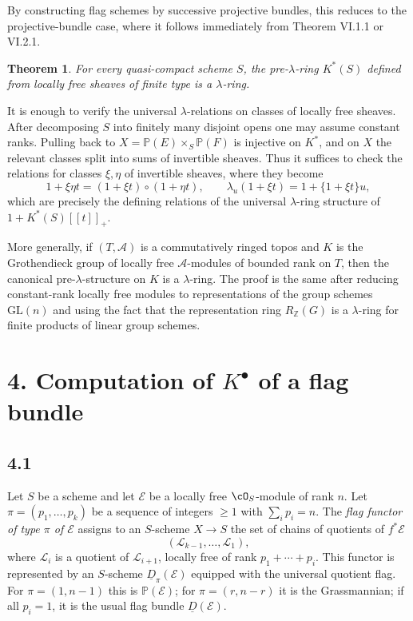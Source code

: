 \documentclass[11pt]{article}
\theoremstyle{plain}
\newtheorem{theorem}{Theorem}[section]
\theoremstyle{definition}
\theoremstyle{remark}
\newcommand{\ZZ}{\mathbb Z}
\begin{document}
By constructing flag schemes by successive projective bundles, this reduces to the projective-bundle case, where it follows immediately from Theorem VI.1.1 or VI.2.1.

\begin{theorem}\label{thm:VI.3.2}
For every quasi-compact scheme $S$, the pre-$\lambda$-ring $K^*(S)$ defined from locally free sheaves of finite type is a $\lambda$-ring.
\end{theorem}

It is enough to verify the universal $\lambda$-relations on classes of locally free sheaves. After decomposing $S$ into finitely many disjoint opens one may assume constant ranks. Pulling back to $X=\mathbb P(E)\times_S\mathbb P(F)$ is injective on $K^*$, and on $X$ the relevant classes split into sums of invertible sheaves. Thus it suffices to check the relations for classes $\xi,\eta$ of invertible sheaves, where they become
\[
1+\xi\eta t=(1+\xi t)\circ(1+\eta t),
\qquad
\lambda_u(1+\xi t)=1+\{1+\xi t\}u,
\]
which are precisely the defining relations of the universal $\lambda$-ring structure of $1+K^*(S)[[t]]_+$.

More generally, if $(T,\mathcal A)$ is a commutatively ringed topos and $K$ is the Grothendieck group of locally free $\mathcal A$-modules of bounded rank on $T$, then the canonical pre-$\lambda$-structure on $K$ is a $\lambda$-ring. The proof is the same after reducing constant-rank locally free modules to representations of the group schemes $\mathrm{GL}(n)$ and using the fact that the representation ring $R_{\ZZ}(G)$ is a $\lambda$-ring for finite products of linear group schemes.

\section*{4. Computation of $K^{\bullet}$ of a flag bundle}

\subsection*{4.1}
Let $S$ be a scheme and let $\mathcal E$ be a locally free $\cO_S$-module of rank $n$. Let $\pi=(p_1,\ldots,p_k)$ be a sequence of integers $\geq 1$ with $\sum_i p_i=n$. The \emph{flag functor of type $\pi$ of $\mathcal E$} assigns to an $S$-scheme $X\to S$ the set of chains of quotients of $f^*\mathcal E$
\[
(\mathcal L_{k-1},\ldots,\mathcal L_1),
\]
where $\mathcal L_i$ is a quotient of $\mathcal L_{i+1}$, locally free of rank $p_1+\cdots+p_i$. This functor is represented by an $S$-scheme $\underline D_\pi(\mathcal E)$ equipped with the universal quotient flag. For $\pi=(1,n-1)$ this is $\mathbb P(\mathcal E)$; for $\pi=(r,n-r)$ it is the Grassmannian; if all $p_i=1$, it is the usual flag bundle $\underline D(\mathcal E)$.
\end{document}
